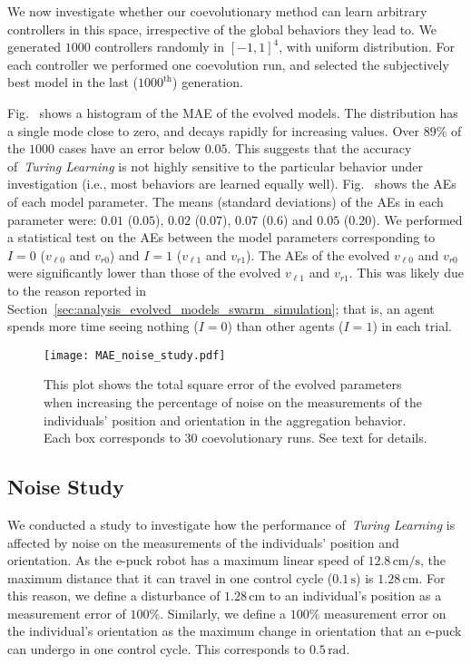 We now investigate whether our coevolutionary method can learn arbitrary controllers in this space, irrespective of the global behaviors they lead to. We generated $1000$ controllers randomly in $[-1,1]^4$, with uniform distribution. For each controller we performed one coevolution run, and selected the subjectively best model in the last ($1000^\textrm{th}$) generation. 

Fig.~ shows a histogram of the MAE of the evolved models. The distribution has a single mode close to zero, and decays rapidly for increasing values. Over $89\%$ of the $1000$ cases have an error below $0.05$. This suggests that the accuracy of~\textit{Turing Learning} is not highly sensitive to the particular behavior under investigation (i.e., most behaviors are learned equally well). Fig.~ shows the AEs of each model parameter. The means (standard deviations) of the AEs in each parameter were: $0.01$ ($0.05$), $0.02$ ($0.07$), $0.07$ ($0.6$) and $0.05$ ($0.20$). We performed a statistical test on the AEs between the model parameters corresponding to $I=0$ ($v_{\ell0}$ and $v_{r0}$) and $I=1$ ($v_{\ell1}$ and $v_{r1}$). The AEs of the evolved $v_{\ell0}$ and  $v_{r0}$ were significantly lower than those of the evolved $v_{\ell1}$ and  $v_{r1}$. This was likely due to the reason reported in Section~\ref{sec:analysis_evolved_models_swarm_simulation}; that is, an agent spends more time seeing nothing ($I=0$) than other agents ($I=1$) in each trial.
\begin{figure}[!h]%
	\centering
	\texttt{[image: MAE\_noise\_study.pdf]}
	\caption{This plot shows the total square error of the evolved parameters when increasing the percentage of noise on the measurements of the individuals' position and orientation in the aggregation behavior. Each box corresponds to 30 coevolutionary runs. See text for details.
\label{fig:noise_study}}
\end{figure}

\subsection{Noise Study}\label{sec:noise_study_swarm_simulation}

We conducted a study to investigate how the performance of~\textit{Turing Learning} is affected by noise on the measurements of the individuals' position and orientation. As the e-puck robot has a maximum linear speed of $12.8\,\textrm{cm/s}$, the maximum distance that it can travel in one control cycle ($0.1\,\textrm{s}$) is $1.28\,\textrm{cm}$. For this reason, we define a disturbance of $1.28\,\textrm{cm}$ to an individual's position as a measurement error of $100\%$. Similarly, we define a $100\%$ measurement error on the individual's orientation as the maximum change in orientation that an e-puck can undergo in one control cycle. This corresponds to $0.5\,\textrm{rad}$.

